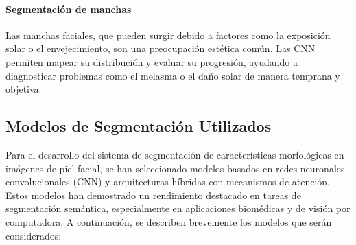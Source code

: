 
\paragraph{Segmentación de manchas}  
Las manchas faciales, que pueden surgir debido a factores como la exposición solar o el envejecimiento, son una preocupación estética común. Las CNN permiten mapear su distribución y evaluar su progresión, ayudando a diagnosticar problemas como el melasma o el daño solar de manera temprana y objetiva. \parencite{autor2020segmentacion}




\subsection{Modelos de Segmentación Utilizados}

Para el desarrollo del sistema de segmentación de características morfológicas en imágenes de piel facial, se han seleccionado modelos basados en redes neuronales convolucionales (CNN) y arquitecturas híbridas con mecanismos de atención. Estos modelos han demostrado un rendimiento destacado en tareas de segmentación semántica, especialmente en aplicaciones biomédicas y de visión por computadora. A continuación, se describen brevemente los modelos que serán considerados:

